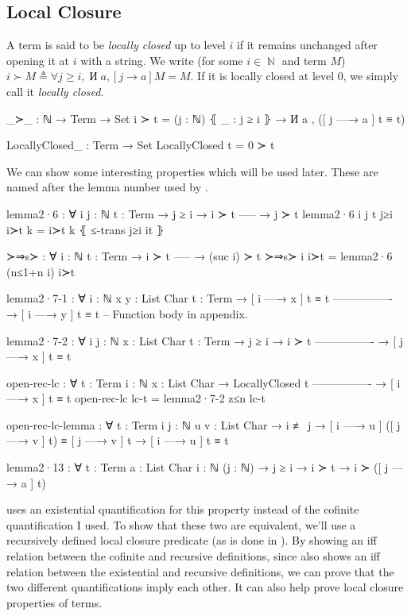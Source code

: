 \documentclass[logo,bsc,singlespacing,parskip,online]{infthesis}
\DeclareMathOperator{\nat}{\mathbb{N}}
\DeclareMathOperator{\cof}{\text{И}}
\renewenvironment{code}{\mintedcopy[breaklines,breaksymbolleft=\;]{agda}}{\endmintedcopy}
\begin{document}
\subsection{Local Closure}
A term is said to be \textit{locally closed} up to level $i$ if it remains unchanged after opening
it at $i$ with a string. We write (for some $i \in \nat$ and term $M$) $i \succ M \triangleq \forall j
\geq i, \cof a , [j \to a] M = M$. If it is locally closed at level $0$, we simply call it
\textit{locally closed}.

\begin{code}
_≻_ : ℕ → Term → Set
i ≻ t = (j : ℕ) ⦃ _ : j ≥ i ⦄ → И a , ([ j —→ a ] t ≡ t)

LocallyClosed_ : Term → Set
LocallyClosed t = 0 ≻ t
\end{code}

We can show some interesting properties which will be used later. These are named after the lemma
number used by \citet{pitts_locally_2023}.

\begin{code}
lemma2·6 : ∀ {i j : ℕ} {t : Term}
  → j ≥ i
  → i ≻ t
    -----
  → j ≻ t
lemma2·6 {i} {j} {t} j≥i i≻t k = i≻t k ⦃ ≤-trans j≥i it ⦄

≻⇒s≻ : ∀ {i : ℕ} {t : Term}
  → i ≻ t
    -----
  → (suc i) ≻ t
≻⇒s≻ {i} i≻t = lemma2·6 (n≤1+n i) i≻t

lemma2·7-1 : ∀ {i : ℕ} {x y : List Char} {t : Term}
  → [ i —→ x ] t ≡ t
    ----------------
  → [ i —→ y ] t ≡ t
-- Function body in appendix.

lemma2·7-2 : ∀ {i j : ℕ} {x : List Char} {t : Term}
  → j ≥ i
  → i ≻ t
    ----------------
  → [ j —→ x ] t ≡ t

open-rec-lc : ∀ {t : Term} {i : ℕ} {x : List Char}
  → LocallyClosed t
    ----------------
  → [ i —→ x ] t ≡ t
open-rec-lc lc-t = lemma2·7-2 z≤n lc-t

open-rec-lc-lemma : ∀ {t : Term} {i j : ℕ} {u v : List Char}
  → i ≢ j
  → [ i —→ u ] ([ j —→ v ] t) ≡ [ j —→ v ] t
  → [ i —→ u ] t ≡ t

lemma2·13 : ∀ {t : Term} {a : List Char} {i : ℕ} (j : ℕ)
  → j ≥ i
  → i ≻ t
  → i ≻ ([ j —→ a ] t)
\end{code}

\citet{pitts_locally_2023} uses an existential quantification for this property instead of the
cofinite quantification I used. To show that these two are equivalent, we'll use a recursively
defined local closure predicate (as is done in \citet{chargueraud_locally_2012}). By showing an iff
relation between the cofinite and recursive definitions, since \citet{pitts_locally_2023} also shows
an iff relation between the existential and recursive definitions, we can prove that the two
different quantifications imply each other. It can also help prove local closure properties of terms.
\end{document}
